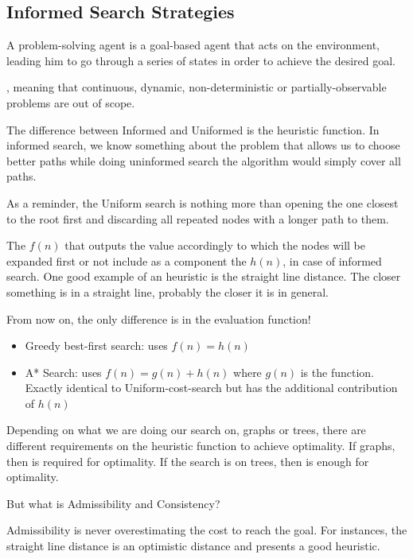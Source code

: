 \subsection{Informed Search Strategies}
A problem-solving agent is a goal-based agent that acts on the environment,
leading him to go through a series of states in order to achieve the desired goal.


, meaning that continuous, dynamic, non-deterministic or partially-observable problems are out of scope.



The difference between Informed and Uniformed is the heuristic function. In informed search, we know something about the problem that allows us to choose better paths while doing uninformed search the algorithm would simply cover all paths.

As a reminder, the Uniform search is nothing more than opening the one closest to the root first and discarding all repeated nodes with a longer path to them.

The  $f(n)$ that outputs the value accordingly to which the nodes will be expanded first or not include as a component the  $h(n)$, in case of informed search. One good example of an heuristic is the straight line distance. The closer something is in a straight line, probably the closer it is in general.


From now on, the only difference is in the evaluation function! 
\begin{itemize}
    \item Greedy best-first search: uses $f(n) = h(n)$
    \item A* Search: uses $f(n) = g(n) + h(n)$ where $g(n)$ is the  function. Exactly identical to Uniform-cost-search but has the additional contribution of $h(n)$
\end{itemize}

Depending on what we are doing our search on, graphs or trees, there are different requirements on the heuristic function to achieve optimality.
If graphs, then  is required for optimality. 
If the search is on trees, then  is enough for optimality.

But what is Admissibility and Consistency?

Admissibility is never overestimating the cost to reach the goal. For instances, the straight line distance is an optimistic distance and presents a good heuristic.

